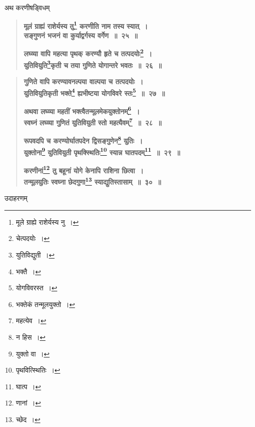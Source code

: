 \documentclass[11pt, openany]{book}
\begin{document}
अथ करणीषड्विधम् \textendash 

 \label{25}
\begin{quote}
\textbf{{\color{purple}मूलं ग्राह्यं राशेर्यस्य तु\renewcommand{\thefootnote}{३}\footnote{मूले ग्राह्ये राशेर्यस्य नु~।} करणीति नाम तस्य स्यात्~।\\
सङ्गुणनं भजनं वा कुर्याद्वर्गस्य वर्गेण~॥~२५~॥}}
\vspace{1mm}

\textbf{{\color{purple}लघ्व्या वापि महत्या पृथक् करण्यौ हृते च तत्पदयोः\renewcommand{\thefootnote}{४}\footnote{चेत्पदयोः~।}~।\\
युतिवियुति\renewcommand{\thefootnote}{५}\footnote{युतिविद्युती~।}कृती च तया गुणिते योगान्तरे भवतः~॥~२६~॥}}
\end{quote}
\vspace{20mm}

\newpage

\begin{quote}
\textbf{{\color{purple}गुणिते वापि करण्यावनल्पया वाल्पया च तत्पदयोः~। \\
युतिवियुतिकृती भक्ते\renewcommand{\thefootnote}{१}\footnote{भक्तै~।} ह्यभीष्टया योगविवरे स्तः\renewcommand{\thefootnote}{२}\footnote{योगविवरस्त~।}~॥~२७~॥}}
\vspace{1mm}

\textbf{{\color{purple}अथवा लघ्व्या महतीं भक्त्वैतन्मूलमेकयुक्तोनम्\renewcommand{\thefootnote}{३}\footnote{भक्तेकं तन्मूलयुक्तो~।}~। \\
स्वघ्नं लघ्व्या गुणितं युतिवियुती स्तो महत्यैवम्\renewcommand{\thefootnote}{४}\footnote{महत्येव~।}~॥~२८~॥}}
\vspace{1mm}

\textbf{{\color{purple}रूपवदपि च करण्योर्घातपदेन द्विसङ्गुणेन\renewcommand{\thefootnote}{५}\footnote{न हिस~।} युतिः~।\\
युक्तोना\renewcommand{\thefootnote}{६}\footnote{युक्तो वा~।} युतिवियुती पृथक्स्थितिः\renewcommand{\thefootnote}{७}\footnote{पृथवित्स्थितिः~।} स्यान्न घातपदम्\renewcommand{\thefootnote}{८}\footnote{घात्प~।}~॥~२९~॥}}
\vspace{1mm}

\textbf{{\color{purple}करणीनां\renewcommand{\thefootnote}{९}\footnote{णानां~।} तु बहूनां योगे केनापि राशिना छित्वा~। \\
तन्मूलयुतिः स्वघ्ना छेदगुणा\renewcommand{\thefootnote}{१०}\footnote{च्छेद~।} स्याद्युतिस्तासाम्~॥~३०~॥}}
\end{quote}

उदाहरणम् \textendash 
\vspace{-2mm}
\end{document}

